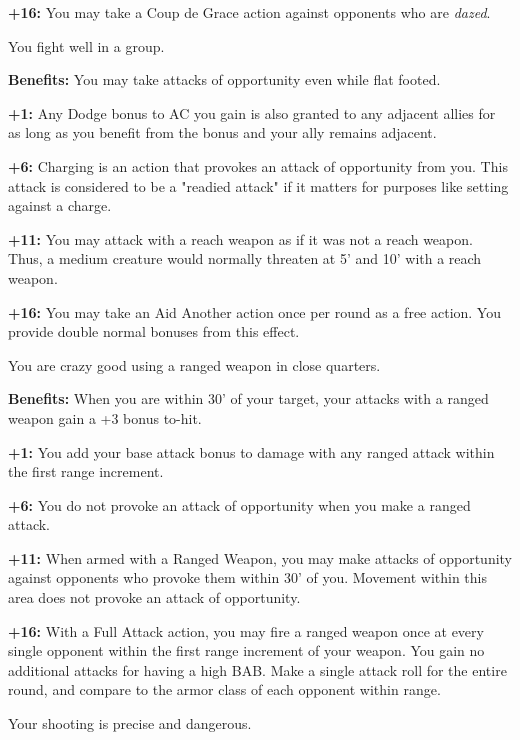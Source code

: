 \textbf{+16:} You may take a Coup de Grace action against opponents who are \textit{dazed}.


You fight well in a group.

\textbf{Benefits:} You may take attacks of opportunity even while flat footed.

\textbf{+1:} Any Dodge bonus to AC you gain is also granted to any adjacent allies for as long as you benefit from the bonus and your ally remains adjacent.

\textbf{+6:} Charging is an action that provokes an attack of opportunity from you. This attack is considered to be a "readied attack" if it matters for purposes like setting against a charge.

\textbf{+11:} You may attack with a reach weapon as if it was not a reach weapon. Thus, a medium creature would normally threaten at 5' and 10' with a reach weapon.

\textbf{+16:} You may take an Aid Another action once per round as a free action. You provide double normal bonuses from this effect.


You are crazy good using a ranged weapon in close quarters.

\textbf{Benefits:} When you are within 30' of your target, your attacks with a ranged weapon gain a +3 bonus to-hit.

\textbf{+1:} You add your base attack bonus to damage with any ranged attack within the first range increment.

\textbf{+6:} You do not provoke an attack of opportunity when you make a ranged attack.

\textbf{+11:} When armed with a Ranged Weapon, you may make attacks of opportunity against opponents who provoke them within 30' of you. Movement within this area does not provoke an attack of opportunity.

\textbf{+16:} With a Full Attack action, you may fire a ranged weapon once at every single opponent within the first range increment of your weapon. You gain no additional attacks for having a high BAB. Make a single attack roll for the entire round, and compare to the armor class of each opponent within range.


Your shooting is precise and dangerous.

